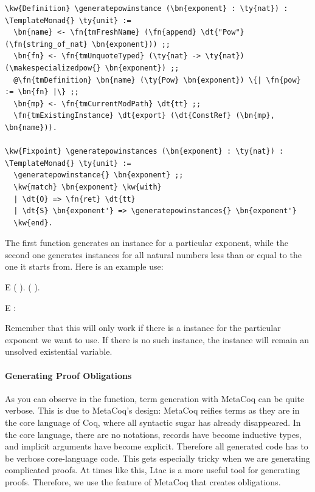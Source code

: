 \newcommand{\generatepowinstance}{\hyperref[code:generatepowinstance]{\fn{generate\_pow\_instance}}}
\newcommand{\generatepowinstances}{\hyperref[code:generatepowinstances]{\fn{generate\_pow\_instances}}}
\label{code:generatepowinstance}
\label{code:generatepowinstances}
\begin{Verbatim}
\kw{Definition} \generatepowinstance (\bn{exponent} : \ty{nat}) : \TemplateMonad{} \ty{unit} :=
  \bn{name} <- \fn{tmFreshName} (\fn{append} \dt{"Pow"} (\fn{string_of_nat} \bn{exponent})) ;;
  \bn{fn} <- \fn{tmUnquoteTyped} (\ty{nat} -> \ty{nat}) (\makespecializedpow{} \bn{exponent}) ;; 
  @\fn{tmDefinition} \bn{name} (\ty{Pow} \bn{exponent}) \{| \fn{pow} := \bn{fn} |\} ;;
  \bn{mp} <- \fn{tmCurrentModPath} \dt{tt} ;;
  \fn{tmExistingInstance} \dt{export} (\dt{ConstRef} (\bn{mp}, \bn{name})).

\kw{Fixpoint} \generatepowinstances (\bn{exponent} : \ty{nat}) : \TemplateMonad{} \ty{unit} :=
  \generatepowinstance{} \bn{exponent} ;;
  \kw{match} \bn{exponent} \kw{with}
  | \dt{O} => \fn{ret} \dt{tt}
  | \dt{S} \bn{exponent'} => \generatepowinstances{} \bn{exponent'}
  \kw{end}.
\end{Verbatim}

The first function generates an instance for a particular exponent, while the second one generates instances for all natural numbers less than or equal to the one it starts from. Here is an example use:

\vspace{.2in}
\begin{SaveVerbatim}{E}
 (\generatepowinstances{} ).
 (  ).
\end{SaveVerbatim}

\begin{SaveVerbatim}{E}
 : 
\end{SaveVerbatim}

Remember that this will only work if there is a  instance for the particular exponent we want to use. If there is no such instance, the  instance will remain an unsolved existential variable.

\paragraph*{Generating Proof Obligations}

As you can observe in the \makespecializedpow{} function, term generation with MetaCoq can be quite verbose. This is due to MetaCoq's design: MetaCoq reifies terms as they are in the core language of Coq, where all syntactic sugar has already disappeared. In the core language, there are no notations, records have become inductive types, and implicit arguments have become explicit. Therefore all generated code has to be verbose core-language code. This gets especially tricky when we are generating complicated proofs. At times like this, \gls{Ltac} is a more useful tool for generating proofs. Therefore, we use the feature of MetaCoq that creates obligations.

